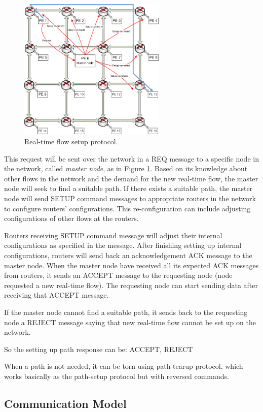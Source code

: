 \documentclass[conference, twocolumn]{IEEEtran}
\theoremstyle{definition}
\begin{document}
\begin{figure}[htp]
\centering
\includegraphics[width=7cm]{pics/Protocol2}
\caption[Setup request for a real-time flow.]
{Real-time flow setup protocol.}\label{fig:ReqSetup}
\end{figure}

This request will be sent over the network in a REQ message to a specific node
in the network, called {\em master node}, as in Figure \ref{fig:ReqSetup}.
Based on its knowledge about other flows in the network and the demand for the
new real-time flow, the master node will seek to find a suitable path. If there
exists a suitable path, the master node will send SETUP command messages to
appropriate routers in the network to configure routers' configurations. This
re-configuration can include adjusting configurations of other flows at the routers.

Routers receiving SETUP command message will adjust their internal
configurations as specified in the message. After finishing setting up internal
configurations, routers will send back an acknowledgement ACK message to
the master node. When the master node have received all its expected ACK
messages from routers, it sends an ACCEPT message to the requesting node
(node requested a new real-time flow). The requesting node can start sending
data after receiving that ACCEPT message.

If the master node cannot find a suitable path, it sends back to the requesting
node a REJECT message saying that new real-time flow cannot be set up on the
network.

So the setting up path response can be: ACCEPT, REJECT

When a path is not needed, it can be torn using path-tearup protocol, which
works basically as the path-setup protocol but with reversed commands.

\subsection{Communication  Model}
\end{document}
